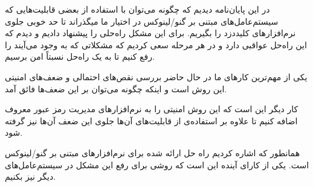 
در این پایان‌نامه دیدیم که چگونه‌ می‌توان با استفاده از بعضی قابلیت‌هایی که سیستم‌عامل‌های مبتنی بر گنو/لینوکس در اختیار ما میگذراند تا حد خوبی جلوی نرم‌افزارهای کلید‌دزد را بگیریم. برای این مشکل راه‌حلی را پیشنهاد دادیم و دیدم که این راه‌حل عواقبی دارد و در هر مرحله سعی کردیم که مشکلاتی که به وجود می‌آیند را رفع کنیم تا به یک راه‌حل نسبتاً امن برسیم. 



یکی از مهم‌ترین کارهای ما در حال حاضر بررسی نقص‌های احتمالی و ضعف‌های امنیتی این روش است و اینکه چگونه می‌توان بر این ضعف‌ها فائق آمد.

کار دیگر این است که این روش امنیتی را به نرم‌افزارهای مدیریت رمز عبور معروف اضافه کنیم تا علاوه بر استفاده‌ی از قابلیت‌های آن‌ها جلوی این ضعف آن‌ها نیز گرفته شود.

همانطور که اشاره کردیم راه حل ارائه شده برای نرم‌افزارهای مبتنی بر گنو/لینوکس است. یکی از کارای آینده این است که روشی برای رفع این مشکل در سیستم‌عامل‌های دیگر نیز بکنیم.


